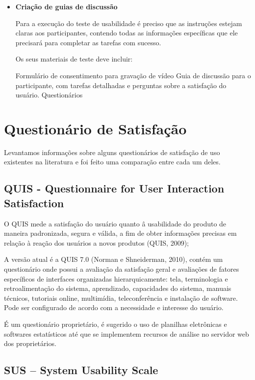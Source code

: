 \begin{itemize}
\item \textbf{Criação de guias de discussão}

Para a execução do teste de usabilidade é preciso que as instruções estejam claras aos participantes, contendo todas as informações específicas que ele precisará para completar as tarefas com sucesso.

Os seus materiais de teste deve incluir:

	
		\subitem Formulário de consentimento para gravação de vídeo
		\subitem Guia de discussão para o participante, com tarefas detalhadas e perguntas sobre a satisfação do usuário.
		\subitem Questionários
	
\end{itemize}


\section{Questionário de Satisfação}

	Levantamos informações sobre alguns questionários de satisfação de uso existentes na literatura e foi feito uma comparação entre cada um deles.

\subsection{QUIS - Questionnaire for User Interaction Satisfaction}

	O QUIS mede a satisfação do usuário quanto â usabilidade do produto de maneira padronizada, segura e válida, a fim de obter informações precisas em relação à reação dos usuários a novos produtos (QUIS, 2009);

	A versão atual é a QUIS 7.0 (Norman e Shneiderman, 2010), contém um questionário onde possui a avaliação da satisfação geral e avaliações de fatores específicos de interfaces organizadas hierarquicamente: tela, terminologia e retroalimentação do sistema, aprendizado, capacidades do sistema, manuais técnicos, tutoriais online, multimídia, teleconferência e instalação de software. Pode ser configurado de acordo com a necessidade e interesse do usuário. 

	É um questionário proprietário, é sugerido o uso de planilhas eletrônicas e softwares estatísticos até que se implementem recursos de análise no servidor web dos proprietários.

\subsection{SUS – System Usability Scale}

